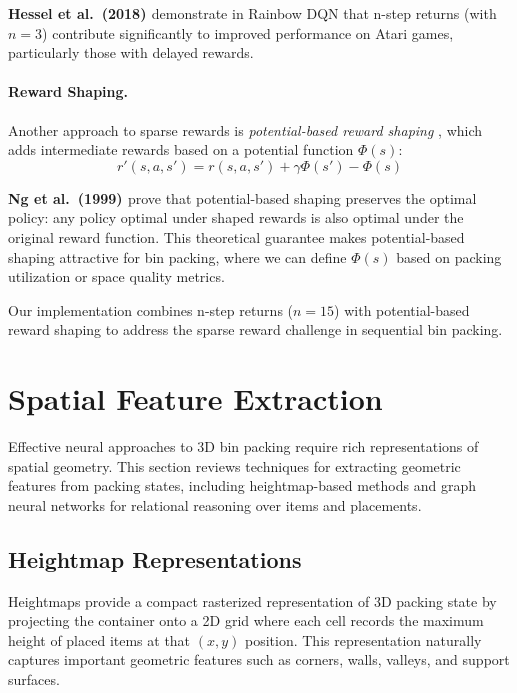 \textbf{Hessel et al.\ (2018) \cite{HMM+18}} demonstrate in Rainbow DQN that n-step returns (with $n=3$) contribute significantly to improved performance on Atari games, particularly those with delayed rewards.

\paragraph{Reward Shaping.}
Another approach to sparse rewards is \textit{potential-based reward shaping} \cite{NHR99}, which adds intermediate rewards based on a potential function $\Phi(s)$:
\[
r'(s, a, s') = r(s, a, s') + \gamma \Phi(s') - \Phi(s)
\]

\textbf{Ng et al.\ (1999) \cite{NHR99}} prove that potential-based shaping preserves the optimal policy: any policy optimal under shaped rewards is also optimal under the original reward function. This theoretical guarantee makes potential-based shaping attractive for bin packing, where we can define $\Phi(s)$ based on packing utilization or space quality metrics.

Our implementation combines n-step returns ($n=15$) with potential-based reward shaping to address the sparse reward challenge in sequential bin packing.

\section{Spatial Feature Extraction}
\label{sec:spatial-features}

Effective neural approaches to 3D bin packing require rich representations of spatial geometry. This section reviews techniques for extracting geometric features from packing states, including heightmap-based methods and graph neural networks for relational reasoning over items and placements.

\subsection{Heightmap Representations}

Heightmaps provide a compact rasterized representation of 3D packing state by projecting the container onto a 2D grid where each cell records the maximum height of placed items at that $(x,y)$ position. This representation naturally captures important geometric features such as corners, walls, valleys, and support surfaces.

